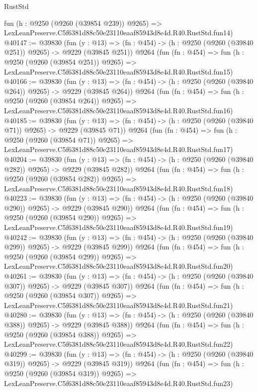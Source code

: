 \begin{lexlean}{RustStd}
\begin{coremodule}
    fun (h : @9250 (@9260 (@39854 @239)) @9265) =>
    LexLeanPreserve.C5f6381d88c50e23110eaaf85943d8e4d.R40.RustStd.fun14)
@40147 := @39830
    (fun (y : @13) => (fn : @454) -> (h : @9250 (@9260 (@39840 @251)) @9265) -> @9229 (@39845 @251))
    @9264
    (fun (fn : @454) =>
    fun (h : @9250 (@9260 (@39854 @251)) @9265) =>
    LexLeanPreserve.C5f6381d88c50e23110eaaf85943d8e4d.R40.RustStd.fun15)
@40166 := @39830
    (fun (y : @13) => (fn : @454) -> (h : @9250 (@9260 (@39840 @264)) @9265) -> @9229 (@39845 @264))
    @9264
    (fun (fn : @454) =>
    fun (h : @9250 (@9260 (@39854 @264)) @9265) =>
    LexLeanPreserve.C5f6381d88c50e23110eaaf85943d8e4d.R40.RustStd.fun16)
@40185 := @39830
    (fun (y : @13) => (fn : @454) -> (h : @9250 (@9260 (@39840 @71)) @9265) -> @9229 (@39845 @71))
    @9264
    (fun (fn : @454) =>
    fun (h : @9250 (@9260 (@39854 @71)) @9265) =>
    LexLeanPreserve.C5f6381d88c50e23110eaaf85943d8e4d.R40.RustStd.fun17)
@40204 := @39830
    (fun (y : @13) => (fn : @454) -> (h : @9250 (@9260 (@39840 @282)) @9265) -> @9229 (@39845 @282))
    @9264
    (fun (fn : @454) =>
    fun (h : @9250 (@9260 (@39854 @282)) @9265) =>
    LexLeanPreserve.C5f6381d88c50e23110eaaf85943d8e4d.R40.RustStd.fun18)
@40223 := @39830
    (fun (y : @13) => (fn : @454) -> (h : @9250 (@9260 (@39840 @290)) @9265) -> @9229 (@39845 @290))
    @9264
    (fun (fn : @454) =>
    fun (h : @9250 (@9260 (@39854 @290)) @9265) =>
    LexLeanPreserve.C5f6381d88c50e23110eaaf85943d8e4d.R40.RustStd.fun19)
@40242 := @39830
    (fun (y : @13) => (fn : @454) -> (h : @9250 (@9260 (@39840 @299)) @9265) -> @9229 (@39845 @299))
    @9264
    (fun (fn : @454) =>
    fun (h : @9250 (@9260 (@39854 @299)) @9265) =>
    LexLeanPreserve.C5f6381d88c50e23110eaaf85943d8e4d.R40.RustStd.fun20)
@40261 := @39830
    (fun (y : @13) => (fn : @454) -> (h : @9250 (@9260 (@39840 @307)) @9265) -> @9229 (@39845 @307))
    @9264
    (fun (fn : @454) =>
    fun (h : @9250 (@9260 (@39854 @307)) @9265) =>
    LexLeanPreserve.C5f6381d88c50e23110eaaf85943d8e4d.R40.RustStd.fun21)
@40280 := @39830
    (fun (y : @13) => (fn : @454) -> (h : @9250 (@9260 (@39840 @388)) @9265) -> @9229 (@39845 @388))
    @9264
    (fun (fn : @454) =>
    fun (h : @9250 (@9260 (@39854 @388)) @9265) =>
    LexLeanPreserve.C5f6381d88c50e23110eaaf85943d8e4d.R40.RustStd.fun22)
@40299 := @39830
    (fun (y : @13) => (fn : @454) -> (h : @9250 (@9260 (@39840 @319)) @9265) -> @9229 (@39845 @319))
    @9264
    (fun (fn : @454) =>
    fun (h : @9250 (@9260 (@39854 @319)) @9265) =>
    LexLeanPreserve.C5f6381d88c50e23110eaaf85943d8e4d.R40.RustStd.fun23)

\end{coremodule}
\end{lexlean}
